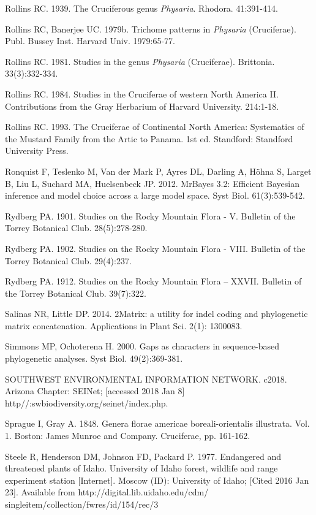 Rollins RC. 1939. The Cruciferous genus \textit{Physaria}. Rhodora. 41:391-414.

Rollins RC, Banerjee UC. 1979b. Trichome patterns in \textit{Physaria} (Cruciferae). Publ. Bussey Inst. Harvard Univ. 1979:65-77.

Rollins RC. 1981. Studies in the genus \textit{Physaria} (Cruciferae). Brittonia. 33(3):332-334.

Rollins RC. 1984. Studies in the Cruciferae of western North America II. Contributions from the Gray Herbarium of Harvard University. 214:1-18.

Rollins RC. 1993. The Cruciferae of Continental North America: Systematics of the Mustard Family from the Artic to Panama. 1st ed. Standford: Standford University Press.

Ronquist F, Teslenko M, Van der Mark P, Ayres DL, Darling A, Höhna S, Larget B, Liu L, Suchard MA, Huelsenbeck JP. 2012. MrBayes 3.2: Efficient Bayesian inference and model choice across a large model space. Syst Biol. 61(3):539-542.

Rydberg PA. 1901. Studies on the Rocky Mountain Flora - V. Bulletin of the Torrey Botanical Club. 28(5):278-280.

Rydberg PA. 1902. Studies on the Rocky Mountain Flora - VIII. Bulletin of the Torrey Botanical Club. 29(4):237.

Rydberg PA. 1912. Studies on the Rocky Mountain Flora – XXVII. Bulletin of the Torrey Botanical Club. 39(7):322.

Salinas NR, Little DP. 2014. 2Matrix: a utility for indel coding and phylogenetic matrix concatenation. Applications in Plant Sci. 2(1): 1300083.

Simmons MP, Ochoterena H. 2000. Gaps as characters in sequence-based phylogenetic analyses. Syst Biol. 49(2):369-381.

SOUTHWEST ENVIRONMENTAL INFORMATION NETWORK. c2018. Arizona Chapter: SEINet; [accessed 2018 Jan 8] http//:swbiodiversity.org/seinet/index.php.

Sprague I, Gray A. 1848. Genera florae americae boreali-orientalis illustrata.  Vol. 1. Boston: James Munroe and Company. Cruciferae, pp. 161-162.  

Steele R, Henderson DM, Johnson FD, Packard P. 1977. Endangered and threatened plants of Idaho. University of Idaho forest, wildlife and range experiment station [Internet]. Moscow (ID): University of Idaho; [Cited 2016 Jan 23]. Available from http://digital.lib.uidaho.edu/cdm/ singleitem/collection/fwres/id/154/rec/3

